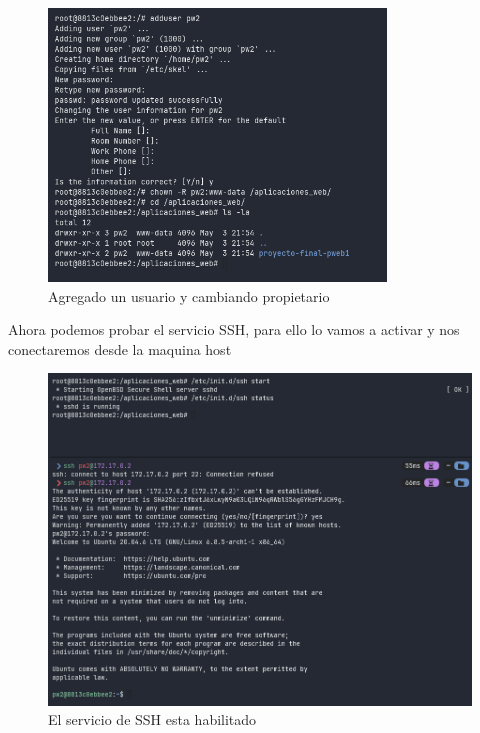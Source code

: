 \begin{figure}[H]
  \centering
  \includegraphics[width=0.8\textwidth]{img/adduser.png}
  \caption{Agregado un usuario y cambiando propietario}
\end{figure}

Ahora podemos probar el servicio SSH, para ello lo vamos a activar y nos conectaremos desde la maquina host

\begin{figure}[H]
  \centering
  \includegraphics[width=1.0\textwidth]{img/ssh.png}
  \caption{El servicio de SSH esta habilitado}
\end{figure}


